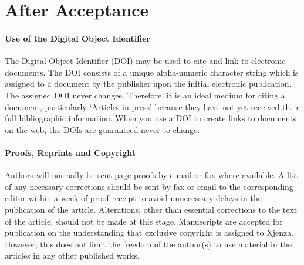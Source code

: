 \section*{After Acceptance}

\paragraph{Use of the Digital Object Identifier}

The Digital Object Identifier (DOI) may be used to cite and link to electronic documents. The DOI consists of a unique alpha-numeric character string which is assigned to a document by the publisher upon the initial electronic publication. The assigned DOI never changes. Therefore, it is an ideal medium for citing a document, particularly `Articles in press' because they have not yet received their full bibliographic information. When you use a DOI to create links to documents on the web, the DOIs are guaranteed never to change.

\balance
\paragraph{Proofs, Reprints and Copyright}

Authors will normally be sent page proofs by e-mail or fax where available. A list of any necessary corrections should be sent by fax or email to the corresponding editor within a week of proof receipt to avoid unnecessary delays in the publication of the article. Alterations, other than essential corrections to the text of the article, should not be made at this stage. Manuscripts are accepted for publication on the understanding that exclusive copyright is assigned to Xjenza. However, this does not limit the freedom of the author(s) to use material in the articles in any other published works.

